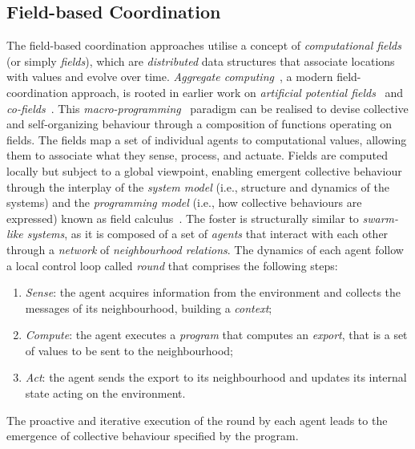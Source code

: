 \documentclass[conference]{IEEEtran}
\begin{document}
\subsection{Field-based Coordination}
The field-based coordination approaches utilise a concept of \emph{computational fields} 
 (or simply \emph{fields}), 
 which are \emph{distributed} data structures that associate locations with values and evolve over time. 
%
\emph{Aggregate computing}~\cite{Beal2015Computer}, a modern field-coordination approach, is rooted in earlier work on \emph{artificial potential fields}~\cite{DBLP:conf/icra/Warren89} and \emph{co-fields}~\cite{DBLP:journals/pervasive/MameiZL04}. 
% 
This \emph{macro-programming}~\cite{DBLP:journals/corr/abs-2201-03473} paradigm can be realised to devise collective and self-organizing behaviour through a composition of functions operating on fields. 
%
The fields map a set of individual agents to computational values, 
 allowing them to associate what they sense, process, and actuate. 
%
Fields are computed locally but subject to a global viewpoint, 
 enabling emergent collective behaviour through the interplay of the \emph{system model} (i.e., structure and dynamics of the systems)
 and the \emph{programming model} (i.e., how collective behaviours are expressed) known as field calculus~\cite{DBLP:conf/esocc/ViroliDB13,DBLP:journals/corr/ViroliADPB16,DBLP:journals/tocl/AudritoVDPB19}.
%
The foster is structurally similar to \emph{swarm-like systems}, 
 as it is composed of a set of \emph{agents} 
 that interact with each other through a \emph{network} of \emph{neighbourhood relations}.
%
The dynamics of each agent follow a local control loop called \emph{round}
 that comprises the following steps:
\begin{enumerate}
  \item \emph{Sense}: the agent acquires information from the environment and collects the messages of its neighbourhood, building a \emph{context};
  \item \emph{Compute}: the agent executes a \emph{program} that computes an \emph{export}, that is a set of values to be sent to the neighbourhood;
  \item \emph{Act}: the agent sends the export to its neighbourhood and updates its internal state acting on the environment.
\end{enumerate}
The proactive and iterative execution of the round by each agent leads to the emergence of collective behaviour specified by the program.
\end{document}
